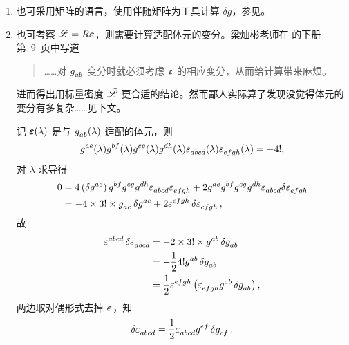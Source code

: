 		\begin{Remark}
			\begin{enumerate}
				\item 也可采用矩阵的语言，使用伴随矩阵为工具计算 $\delta g$，参见。
				\item 也可考察 $\mathscr{L} = R \bm{\varepsilon}$，则需要计算适配体元的变分。梁灿彬老师在  的下册第~9~页中写道
				\begin{quote}
					……对 $\tensor{g}{_a_b}$ 变分时就必须考虑 $\bm{\varepsilon}$ 的相应变分，从而给计算带来麻烦。
				\end{quote}
				进而得出用标量密度 $\tilde{\mathscr{L}}$ 更合适的结论。然而鄙人实际算了发现没觉得体元的变分有多复杂……见下文。

				记 $\bm{\varepsilon}(\lambda)$ 是与 $\tensor{g}{_a_b}(\lambda)$ 适配的体元，则
				\begin{equation}
					\tensor{g}{^a^e}(\lambda) \tensor{g}{^b^f}(\lambda) \tensor{g}{^c^g}(\lambda) \tensor{g}{^d^h}(\lambda) \tensor{\vol}{_a_b_c_d}(\lambda) \tensor{\vol}{_e_f_g_h}(\lambda) = - 4!,
				\end{equation}
				对 $\lambda$ 求导得
				\begin{equation}
					\begin{split}
						0 &= 4 \left( \var \tensor{g}{^a^e} \right) \tensor{g}{^b^f} \tensor{g}{^c^g} \tensor{g}{^d^h} \tensor{\vol}{_a_b_c_d} \tensor{\vol}{_e_f_g_h} + 2 \tensor{g}{^a^e} \tensor{g}{^b^f} \tensor{g}{^c^g} \tensor{g}{^d^h} \tensor{\vol}{_a_b_c_d} \var \tensor{\vol}{_e_f_g_h}\\
						&= - 4 \times 3! \times \tensor{g}{_a_e} \var{\tensor{g}{^a^e}} + 2 \tensor{\vol}{^e^f^g^h} \var{\tensor{\vol}{_e_f_g_h}},
					\end{split}
				\end{equation}
				故
				\begin{equation}
					\begin{split}
						\tensor{\vol}{^a^b^c^d} \var{\tensor{\vol}{_a_b_c_d}} &= - 2 \times 3! \times \tensor{g}{^a^b} \var{\tensor{g}{_a_b}}\\
						&= - \frac{1}{2} 4! \tensor{g}{^a^b} \var{\tensor{g}{_a_b}}\\
						&= \frac{1}{2} \tensor{\vol}{^e^f^g^h} \left( \tensor{\vol}{_e_f_g_h} \tensor{g}{^a^b} \var{\tensor{g}{_a_b}} \right),
					\end{split}
				\end{equation}
				两边取对偶形式去掉 $\bm{\varepsilon}$，知
				\begin{equation}
					\var{\tensor{\vol}{_a_b_c_d}} = \frac{1}{2} \tensor{\vol}{_a_b_c_d} \tensor{g}{^e^f} \var{\tensor{g}{_e_f}}.
				\end{equation}


\end{enumerate}
\end{Remark}
